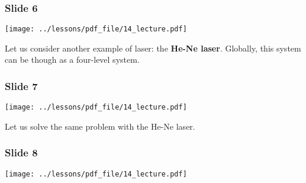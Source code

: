 \documentclass[../main/main.tex]{subfiles}
\begin{document}
\subsubsection*{Slide 6}

\begin{minipage}[]{0.5\linewidth}
\centering
\texttt{[image: ../lessons/pdf\_file/14\_lecture.pdf]}
\end{minipage}
\hspace{0.3cm}\vspace{0.3cm}
\begin{minipage}[c]{0.47\linewidth}

Let us consider another example of laser: the \textbf{He-Ne laser}. Globally, this system can be though as a four-level system.

\end{minipage}

\newpage

\subsubsection*{Slide 7}

\begin{minipage}[]{0.5\linewidth}
\centering
\texttt{[image: ../lessons/pdf\_file/14\_lecture.pdf]}
\end{minipage}
\hspace{0.3cm}\vspace{0.3cm}
\begin{minipage}[c]{0.47\linewidth}

Let us solve the same problem with the He-Ne laser.

\end{minipage}

\subsubsection*{Slide 8}

\begin{minipage}[]{0.5\linewidth}
\centering
\texttt{[image: ../lessons/pdf\_file/14\_lecture.pdf]}
\end{minipage}
\hspace{0.3cm}\vspace{0.3cm}
\begin{minipage}[c]{0.47\linewidth}

\end{minipage}
\end{document}
